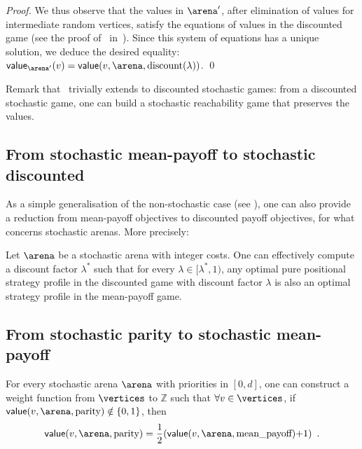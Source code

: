 \begin{proof}
    We thus observe that the values in $\arena'$, after elimination of
    values for intermediate random vertices, satisfy the equations of
    values in the discounted game (see the proof
    of~ in~). Since
    this system of equations has a unique solution, we deduce the
    desired equality:
    $\mathsf{value}_{\arena'}(v) =
    \mathsf{value}(v,\arena,\textrm{discount}(\lambda))$.
    \qed
  \end{proof}

  Remark that~ trivially extends to
  discounted stochastic games: from a discounted stochastic game, one
  can build a stochastic reachability game that preserves the values.

\subsection{From stochastic mean-payoff to stochastic discounted}

As a simple generalisation of the non-stochastic case (see
 ), one can
also provide a reduction from mean-payoff objectives to discounted
payoff objectives, for what concerns stochastic arenas. More
precisely:

\begin{theorem}
  Let $\arena$ be a stochastic arena with integer costs. One can
  effectively compute a discount factor $\lambda^*$ such that for
  every $\lambda \in [\lambda^*,1)$, any optimal pure positional
  strategy profile in the discounted game with discount factor
  $\lambda$ is also an optimal strategy profile in the mean-payoff
  game.
\end{theorem}


\subsection{From stochastic parity  to stochastic mean-payoff}


\begin{proposition}
  For every stochastic arena $\arena$ with priorities in $[0,d]$, one
  can construct a weight function from $\vertices$ to $\mathbb{Z}$
  such that $\forall v \in \vertices$, if
  $ \mathsf{value}(v,\arena,\textrm{parity}) \notin \{0,1\}$, then
  \[
    \mathsf{value}(v,\arena,\textrm{parity}) =
    \frac 1 2 (\mathsf{value}(v,\arena,\textrm{mean\_payoff})  {+} 1) \enspace.
  \]
\end{proposition}

